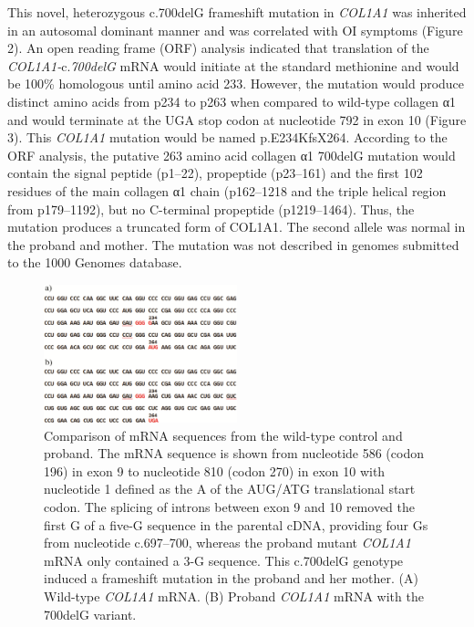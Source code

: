 \par This novel, heterozygous c.700delG frameshift mutation in \textit{COL1A1}
                    was inherited in an autosomal dominant manner and was correlated with OI
                    symptoms (Figure 2). An open reading frame
                    (ORF) analysis indicated that translation of the
                        \textit{COL1A1-}c.\textit{700delG} mRNA would initiate at
                    the standard methionine and would be 100\% homologous until amino acid 233.
                    However, the mutation would produce distinct amino acids from p234 to p263 when
                    compared to wild-type collagen α1 and would terminate at the UGA stop codon at
                    nucleotide 792 in exon 10 (Figure 3). This
                        \textit{COL1A1} mutation would be named p.E234KfsX264. According to
                    the ORF analysis, the putative 263 amino acid collagen α1 700delG mutation would
                    contain the signal peptide (p1–22), propeptide (p23–161) and the first 102
                    residues of the main collagen α1 chain (p162–1218 and the triple helical region
                    from p179–1192), but no C-terminal propeptide (p1219–1464). Thus, the mutation
                    produces a truncated form of COL1A1. The second allele was normal in the proband
                    and mother. The mutation was not described in genomes submitted to the 1000
                    Genomes database.
\begin{figure}[p]
\centering
\includegraphics[width=0.5\textwidth]{1415-4757-gmb-38-1-1-gf03.png}
\caption{Comparison of mRNA sequences from the wild-type control and proband.
                            The mRNA sequence is shown from nucleotide 586 (codon 196) in exon 9 to
                            nucleotide 810 (codon 270) in exon 10 with nucleotide 1 defined as the A
                            of the AUG/ATG translational start codon. The splicing of introns
                            between exon 9 and 10 removed the first G of a five-G sequence in the
                            parental cDNA, providing four Gs from nucleotide c.697–700, whereas the
                            proband mutant \textit{COL1A1} mRNA only contained a 3-G
                            sequence. This c.700delG genotype induced a frameshift mutation in the
                            proband and her mother. (A) Wild-type \textit{COL1A1} mRNA. (B)
                            Proband \textit{COL1A1} mRNA with the 700delG variant.}
\label{Figure 3}
\end{figure}

